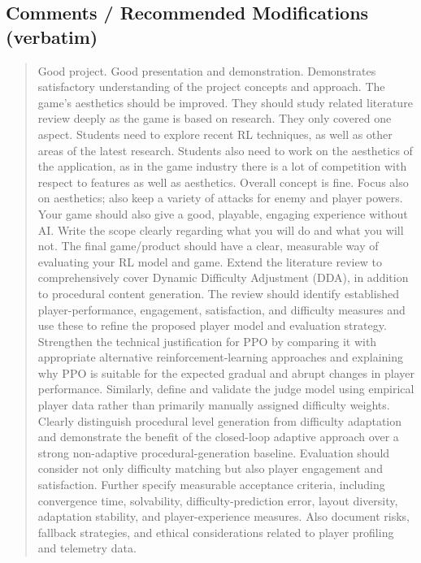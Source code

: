 \subsection*{Comments / Recommended Modifications (verbatim)}
\begin{quote}\small
Good project. Good presentation and demonstration. Demonstrates satisfactory understanding of the project concepts and approach. The game's aesthetics should be improved. They should study related literature review deeply as the game is based on research. They only covered one aspect. Students need to explore recent RL techniques, as well as other areas of the latest research. Students also need to work on the aesthetics of the application, as in the game industry there is a lot of competition with respect to features as well as aesthetics. Overall concept is fine. Focus also on aesthetics; also keep a variety of attacks for enemy and player powers. Your game should also give a good, playable, engaging experience without AI. Write the scope clearly regarding what you will do and what you will not. The final game/product should have a clear, measurable way of evaluating your RL model and game. Extend the literature review to comprehensively cover Dynamic Difficulty Adjustment (DDA), in addition to procedural content generation. The review should identify established player-performance, engagement, satisfaction, and difficulty measures and use these to refine the proposed player model and evaluation strategy. Strengthen the technical justification for PPO by comparing it with appropriate alternative reinforcement-learning approaches and explaining why PPO is suitable for the expected gradual and abrupt changes in player performance. Similarly, define and validate the judge model using empirical player data rather than primarily manually assigned difficulty weights. Clearly distinguish procedural level generation from difficulty adaptation and demonstrate the benefit of the closed-loop adaptive approach over a strong non-adaptive procedural-generation baseline. Evaluation should consider not only difficulty matching but also player engagement and satisfaction. Further specify measurable acceptance criteria, including convergence time, solvability, difficulty-prediction error, layout diversity, adaptation stability, and player-experience measures. Also document risks, fallback strategies, and ethical considerations related to player profiling and telemetry data.
\end{quote}

